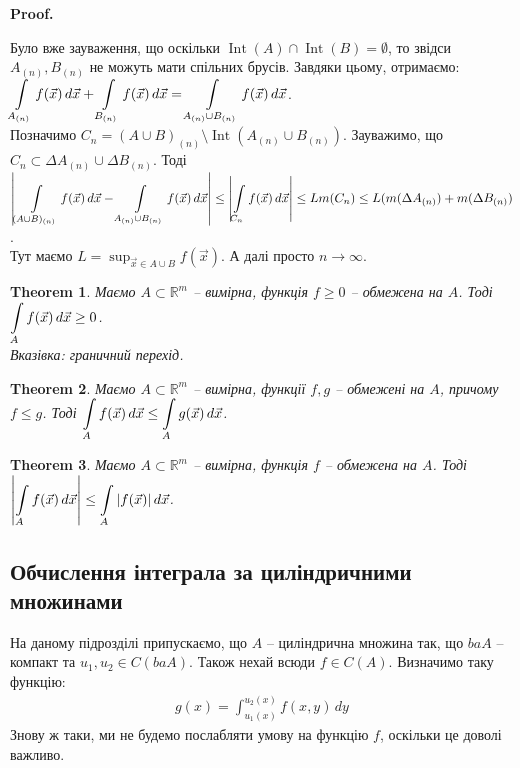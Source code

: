 \documentclass[a4paper, 10pt]{article}
\makeatletter
\def\qed{$\blacksquare$}
\theoremstyle{theoremdd}
\newtheorem{theorem}{Theorem}[subsection]
\theoremstyle{theoremdd}
\theoremstyle{theoremdd}
\theoremstyle{theoremdd}
\theoremstyle{theoremdd}
\theoremstyle{theoremdd}
\theoremstyle{theoremdd}
\theoremstyle{theoremdd}
\theoremstyle{theoremdd}
\theoremstyle{theoremdd}
\theoremstyle{theoremdd}
\theoremstyle{theoremdd}
\theoremstyle{theoremdd}
\theoremstyle{theoremdd}
\theoremstyle{theoremdd}
\renewenvironment{proof}[1][Proof.\\]{\par
\pushQED{\hfill \qed}%
\normalfont \topsep6\p@\@plus6\p@\relax
\trivlist
\item\relax
{\bfseries
#1\@addpunct{.}}\hspace\labelsep\ignorespaces
}{%
\popQED\endtrivlist\@endpefalse
}
\DeclareMathOperator{\Int}{Int}
\makeatother
\begin{document}
\begin{proof}
Було вже зауваження, що оскільки $\Int(A) \cap \Int(B) = \emptyset$, то звідси $A_{(n)},B_{(n)}$ не можуть мати спільних брусів. Завдяки цьому, отримаємо:\\
$\displaystyle\int\displaylimits_{A_{(n)}} f(\vec{x})\,d\vec{x} + \int\displaylimits_{B_{(n)}} f(\vec{x})\,d\vec{x} = \int\displaylimits_{A_{(n)} \cup B_{(n)}} f(\vec{x})\,d\vec{x}$.\\
Позначимо $C_n = (A \cup B)_{(n)} \setminus \Int( A_{(n)} \cup B_{(n)} )$. Зауважимо, що $C_n \subset \Delta A_{(n)} \cup \Delta B_{(n)}$. Тоді\\
$\displaystyle\abs{\int\displaylimits_{(A \cup B)_{(n)}} f(\vec{x})\,d\vec{x} - \int\displaylimits_{A_{(n)} \cup B_{(n)}} f(\vec{x})\,d\vec{x}} \leq \abs{\int\displaylimits_{C_n} f(\vec{x})\,d\vec{x}} \leq L m(C_n) \leq L(m(\Delta A_{(n)}) + m(\Delta B_{(n)})$.\\
Тут маємо $L = \displaystyle\sup_{\vec{x} \in A \cup B} f(\vec{x})$. А далі просто $n \to \infty$.
\end{proof}

\begin{theorem}
Маємо $A \subset \mathbb{R}^m$ -- вимірна, функція $f \geq 0$ -- обмежена на $A$. Тоді $\displaystyle\int\displaylimits_A f(\vec{x})\,d\vec{x} \geq 0$.\\
\textit{Вказівка: граничний перехід.}
\end{theorem}

\begin{theorem}
Маємо $A \subset \mathbb{R}^m$ -- вимірна, функції $f,g$ -- обмежені на $A$, причому $f \leq g$. Тоді $\displaystyle\int\displaylimits_A f(\vec{x})\,d\vec{x} \leq \int\displaylimits_A g(\vec{x})\,d\vec{x}$.
\end{theorem}

\begin{theorem}
Маємо $A \subset \mathbb{R}^m$ -- вимірна, функція $f$ -- обмежена на $A$. Тоді $\displaystyle\abs{\int\displaylimits_A f(\vec{x})\,d\vec{x}} \leq \int\displaylimits_A |f(\vec{x})|\,d\vec{x}$.
\end{theorem}



\subsection{Обчислення інтеграла за циліндричними множинами}
На даному підрозділі припускаємо, що $A$ -- циліндрична множина так, що $baA$ -- компакт та $u_1,u_2 \in C(baA)$. Також нехай всюди $f \in C(A)$. Визначимо таку функцію:
\begin{align*}
g(x)= \int_{u_1(x)}^{u_2(x)} f(x,y)\,dy
\end{align*}
Знову ж таки, ми не будемо послабляти умову на функцію $f$, оскільки це доволі важливо.
\end{document}
